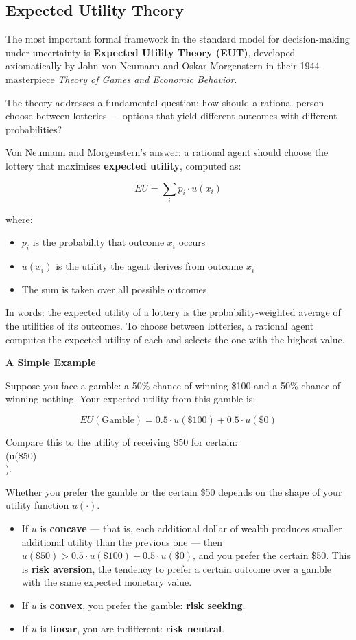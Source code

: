 \documentclass[12pt, letterpaper]{article}
\begin{document}
\medskip
\newpage

\subsection{Expected Utility Theory}


The most important formal framework in the standard model for decision-making under uncertainty is \textbf{Expected Utility Theory (EUT)}, developed axiomatically by John von Neumann and Oskar Morgenstern in their 1944 masterpiece \textit{Theory of Games and Economic Behavior}.

The theory addresses a fundamental question: how should a rational person choose between lotteries --- options that yield different outcomes with different probabilities?

Von Neumann and Morgenstern's answer: a rational agent should choose the lottery that maximises \textbf{expected utility}, computed as:

$$EU = \sum_{i} p_i \cdot u(x_i)$$

where:
\begin{itemize}
\item $p_i$ is the probability that outcome $x_i$ occurs
\item $u(x_i)$ is the utility the agent derives from outcome $x_i$
\item The sum is taken over all possible outcomes
\end{itemize}

In words: the expected utility of a lottery is the probability-weighted average of the utilities of its outcomes. To choose between lotteries, a rational agent computes the expected utility of each and selects the one with the highest value.

\textbf{A Simple Example}

Suppose you face a gamble: a 50\% chance of winning \$100 and a 50\% chance of winning nothing. Your expected utility from this gamble is:

$$EU(\text{Gamble}) = 0.5 \cdot u(\$100) + 0.5 \cdot u(\$0)$$

Compare this to the utility of receiving \$50 for certain: \\(u(\$50)\\).

Whether you prefer the gamble or the certain \$50 depends on the shape of your utility function $u(\cdot)$.

\begin{itemize}
\item If $u$ is \textbf{concave} --- that is, each additional dollar of wealth produces smaller additional utility than the previous one --- then \(u(\$50) > 0.5 \cdot u(\$100) + 0.5 \cdot u(\$0)\), and you prefer the certain \$50. This is \textbf{risk aversion}, the tendency to prefer a certain outcome over a gamble with the same expected monetary value.
\item If $u$ is \textbf{convex}, you prefer the gamble: \textbf{risk seeking}.
\item If $u$ is \textbf{linear}, you are indifferent: \textbf{risk neutral}.
\end{itemize}
\end{document}
